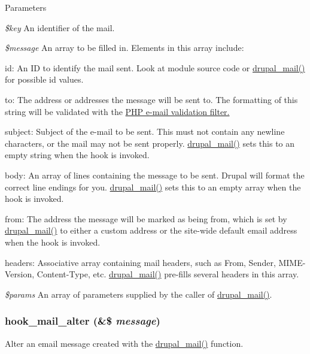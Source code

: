 \begin{DoxyParams}{Parameters}
\item[{\em \$key}]An identifier of the mail. \item[{\em \$message}]An array to be filled in. Elements in this array include:
\begin{DoxyItemize}
\item id: An ID to identify the mail sent. Look at module source code or \hyperlink{mail_8inc_ab80781fd7273975a77cbbd13300eddbf}{drupal\_\-mail()} for possible id values.
\item to: The address or addresses the message will be sent to. The formatting of this string will be validated with the \hyperlink{}{PHP e-\/mail validation filter. }
\item subject: Subject of the e-\/mail to be sent. This must not contain any newline characters, or the mail may not be sent properly. \hyperlink{mail_8inc_ab80781fd7273975a77cbbd13300eddbf}{drupal\_\-mail()} sets this to an empty string when the hook is invoked.
\item body: An array of lines containing the message to be sent. Drupal will format the correct line endings for you. \hyperlink{mail_8inc_ab80781fd7273975a77cbbd13300eddbf}{drupal\_\-mail()} sets this to an empty array when the hook is invoked.
\item from: The address the message will be marked as being from, which is set by \hyperlink{mail_8inc_ab80781fd7273975a77cbbd13300eddbf}{drupal\_\-mail()} to either a custom address or the site-\/wide default email address when the hook is invoked.
\item headers: Associative array containing mail headers, such as From, Sender, MIME-\/Version, Content-\/Type, etc. \hyperlink{mail_8inc_ab80781fd7273975a77cbbd13300eddbf}{drupal\_\-mail()} pre-\/fills several headers in this array. 
\end{DoxyItemize}\item[{\em \$params}]An array of parameters supplied by the caller of \hyperlink{mail_8inc_ab80781fd7273975a77cbbd13300eddbf}{drupal\_\-mail()}. \end{DoxyParams}
\hypertarget{group__hooks_gaad1d55a8e7b359933f462a9ca5b2ede0}{
\subsubsection[{hook\_\-mail\_\-alter}]{\setlength{\rightskip}{0pt plus 5cm}hook\_\-mail\_\-alter (\&\$ {\em message})}}
\label{group__hooks_gaad1d55a8e7b359933f462a9ca5b2ede0}
Alter an email message created with the \hyperlink{mail_8inc_ab80781fd7273975a77cbbd13300eddbf}{drupal\_\-mail()} function.

